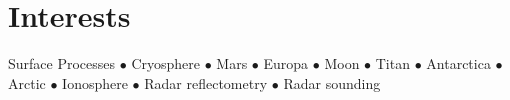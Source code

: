 \section*{Interests}

Surface Processes $\bullet$ Cryosphere $\bullet$ Mars $\bullet$ Europa $\bullet$ Moon $\bullet$ Titan $\bullet$ Antarctica $\bullet$ Arctic $\bullet$ Ionosphere $\bullet$ Radar reflectometry $\bullet$ Radar sounding